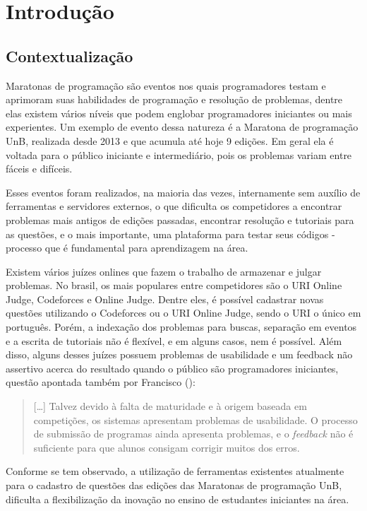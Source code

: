 \chapter[Introdução]{Introdução}

\section{Contextualização}

Maratonas de programação são eventos nos quais programadores testam e aprimoram suas habilidades de programação e resolução de problemas, dentre elas existem vários níveis que podem englobar programadores iniciantes ou mais experientes. Um exemplo de evento dessa natureza é a Maratona de programação UnB, realizada desde 2013 e que acumula até hoje 9 edições. Em geral ela é voltada para o público iniciante e intermediário, pois os problemas variam entre fáceis e difíceis.

Esses eventos foram realizados, na maioria das vezes, internamente sem auxílio de ferramentas e servidores externos, o que dificulta os competidores a encontrar problemas mais antigos de edições passadas, encontrar resolução e tutoriais para as questões, e o mais importante, uma plataforma para testar seus códigos - processo que é fundamental para aprendizagem na área.

Existem vários juízes onlines que fazem o trabalho de armazenar e julgar problemas. No brasil, os mais populares entre competidores são o URI Online Judge, Codeforces e Online Judge. Dentre eles, é possível cadastrar novas questões utilizando o Codeforces ou o URI Online Judge, sendo o URI o único em português. Porém, a indexação dos problemas para buscas, separação em eventos e a escrita de tutoriais não é flexível, e em alguns casos, nem é possível. Além disso, alguns desses juízes possuem problemas de usabilidade e um feedback não assertivo acerca do resultado quando o público são programadores iniciantes, questão apontada também por Francisco (\citeyear{francisco_re:JONEPI}):
\begin{quotation}
    [\dots] Talvez devido à falta de maturidade e à origem baseada em competições, os sistemas apresentam problemas de usabilidade. O processo de submissão de programas ainda apresenta problemas, e o \textit{feedback} não é suficiente para que alunos consigam corrigir muitos dos erros.
\end{quotation}

Conforme se tem observado, a utilização de ferramentas existentes atualmente para o cadastro de questões das edições das Maratonas de programação UnB, dificulta a flexibilização da inovação no ensino de estudantes iniciantes na área.

